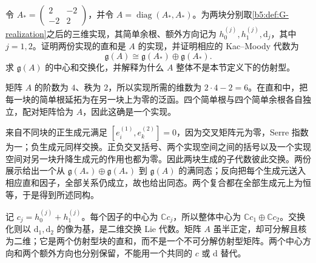 \begin{exercise}\label{b5:ex:G-two-affine-components}
	令 \(A_*=\begin{pmatrix}2&-2\\-2&2\end{pmatrix}\)，并令 \(A=\operatorname{diag}(A_*,A_*)\)。为两块分别取\cref{b5:def:G-realization}之后的三维实现，其简单余根、额外方向记为 \(h_0^{(j)},h_1^{(j)},\mathrm d_j\)，其中 \(j=1,2\)。证明两份实现的直和是 \(A\) 的实现，并证明相应的 Kac--Moody 代数为
	\[
		\mathfrak g(A)\cong\mathfrak g(A_*)\oplus\mathfrak g(A_*).
	\]
	求 \(\mathfrak g(A)\) 的中心和交换化，并解释为什么 \(A\) 整体不是本节定义下的仿射型。
\end{exercise}
\begin{solution}
	矩阵 \(A\) 的阶数为 \(4\)、秩为 \(2\)，所以实现所需的维数为 \(2\cdot4-2=6\)。在直和中，把每一块的简单根延拓为在另一块上为零的泛函。四个简单根与四个简单余根各自独立，配对矩阵恰为 \(A\)，因此这确是一个实现。

	来自不同块的正生成元满足 \([e_i^{(1)},e_k^{(2)}]=0\)，因为交叉矩阵元为零，Serre 指数为一；负生成元同样交换。正负交叉括号、两个实现空间之间的括号以及一个实现空间对另一块升降生成元的作用也都为零。因此两块生成的子代数彼此交换。两份展示给出一个从 \(\mathfrak g(A_*)\oplus\mathfrak g(A_*)\) 到 \(\mathfrak g(A)\) 的满同态；反向把每个生成元送入相应直和因子，全部关系仍成立，故也给出同态。两个复合都在全部生成元上为恒等，于是得到所述同构。

	记 \(c_j=h_0^{(j)}+h_1^{(j)}\)。每个因子的中心为 \(\mathbb Cc_j\)，所以整体中心为 \(\mathbb Cc_1\oplus\mathbb Cc_2\)。交换化则以 \(\mathrm d_1,\mathrm d_2\) 的像为基，是二维交换 Lie 代数。矩阵 \(A\) 虽半正定，却可分解且核为二维；它是两个仿射型块的直和，而不是一个不可分解仿射型矩阵。两个中心方向和两个额外方向也分别保留，不能用一个共同的 \(c\) 或 \(\mathrm d\) 替代。
\end{solution}


